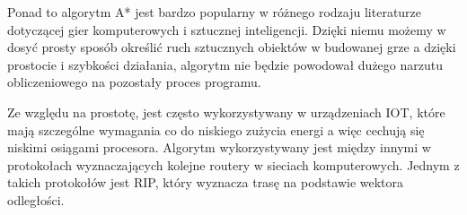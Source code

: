 Ponad to algorytm A* jest bardzo popularny w różnego rodzaju literaturze dotyczącej gier komputerowych i sztucznej inteligencji. 
Dzięki niemu możemy w dosyć prosty sposób określić ruch sztucznych obiektów w budowanej grze a dzięki prostocie 
i szybkości działania, algorytm nie będzie powodował dużego narzutu obliczeniowego na pozostały proces programu\cite{aStarGame}.

Ze względu na prostotę, jest często wykorzystywany w urządzeniach IOT, które mają szczególne wymagania co do niskiego 
zużycia energi a więc cechują się niskimi osiągami procesora. Algorytm wykorzystywany jest między innymi w protokołach 
wyznaczających kolejne routery w sieciach komputerowych\cite{aStarIOT}. Jednym z takich protokołów jest RIP,
który wyznacza trasę na podstawie wektora odległości. 